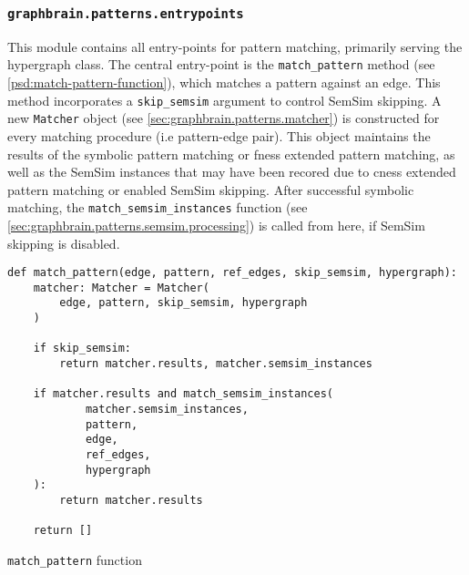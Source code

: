 \documentclass[11pt]{scrreprt}
\begin{document}
\subsubsection{\texttt{graphbrain.patterns.entrypoints}}
\label{sec:graphbrain.patterns.entrypoints}
This module contains all entry-points for pattern matching, primarily serving the hypergraph class. The central entry-point is the \texttt{match\_pattern} method (see \cref{psd:match-pattern-function}), which matches a pattern against an edge. This method incorporates a \texttt{skip\_semsim} argument to control SemSim skipping. A new \texttt{Matcher} object (see \cref{sec:graphbrain.patterns.matcher}) is constructed for every matching procedure (i.e pattern-edge pair). This object maintains the results of the symbolic pattern matching or \gls{fness} extended pattern matching, as well as the SemSim instances that may have been recored due to \gls{cness} extended pattern matching or enabled SemSim skipping. After successful symbolic matching, the \texttt{match\_semsim\_instances} function (see \cref{sec:graphbrain.patterns.semsim.processing}) is called from here, if SemSim skipping is disabled. 



\begin{pseudo}
\begin{lstlisting}
def match_pattern(edge, pattern, ref_edges, skip_semsim, hypergraph):
    matcher: Matcher = Matcher(
        edge, pattern, skip_semsim, hypergraph
    )

    if skip_semsim:
        return matcher.results, matcher.semsim_instances

    if matcher.results and match_semsim_instances(
            matcher.semsim_instances,
            pattern,
            edge,
            ref_edges,
            hypergraph
    ):
        return matcher.results

    return []
\end{lstlisting}
\caption{\texttt{match\_pattern} function}
\label{psd:match-pattern-function}
\end{pseudo}
\end{document}
